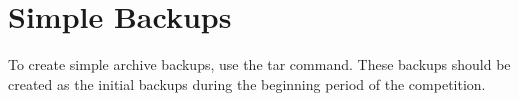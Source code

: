 \section{Simple Backups}

To create simple archive backups, use the tar command. These backups should be created as the initial backups during the beginning period of the competition.

